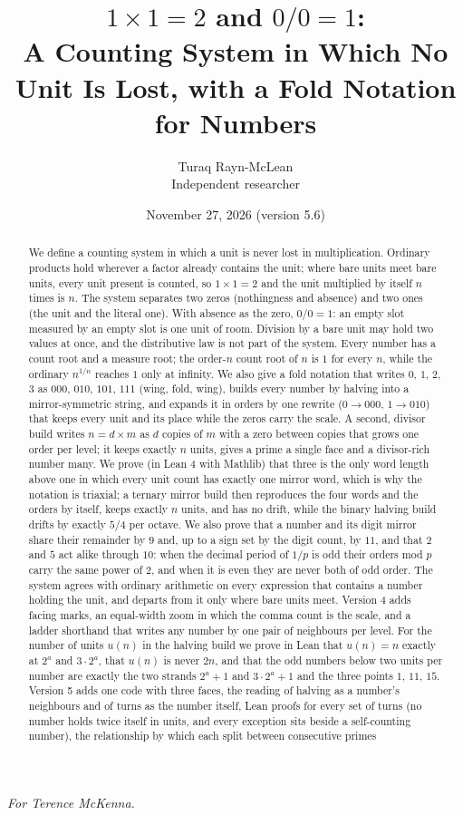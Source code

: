 \documentclass[11pt]{article}
\title{$1\times1 = 2$ and $0/0 = 1$:\\[4pt]\large A Counting System in Which No Unit Is Lost, with a Fold Notation for Numbers}
\author{Turaq Rayn-McLean\\Independent researcher}
\date{November 27, 2026 (version 5.6)}
\begin{document}
\maketitle
\begin{center}\emph{For Terence McKenna.}\end{center}

\begin{abstract}
We define a counting system in which a unit is never lost in multiplication. Ordinary products hold wherever a factor already contains the unit; where bare units meet bare units, every unit present is counted, so $1\times1 = 2$ and the unit multiplied by itself $n$ times is $n$. The system separates two zeros (nothingness and absence) and two ones (the unit and the literal one). With absence as the zero, $0/0 = 1$: an empty slot measured by an empty slot is one unit of room. Division by a bare unit may hold two values at once, and the distributive law is not part of the system. Every number has a count root and a measure root; the order-$n$ count root of $n$ is $1$ for every $n$, while the ordinary $n^{1/n}$ reaches $1$ only at infinity. We also give a fold notation that writes $0$, $1$, $2$, $3$ as $000$, $010$, $101$, $111$ (wing, fold, wing), builds every number by halving into a mirror-symmetric string, and expands it in orders by one rewrite ($0\to000$, $1\to010$) that keeps every unit and its place while the zeros carry the scale. A second, divisor build writes $n = d\times m$ as $d$ copies of $m$ with a zero between copies that grows one order per level; it keeps exactly $n$ units, gives a prime a single face and a divisor-rich number many. We prove (in Lean 4 with Mathlib) that three is the only word length above one in which every unit count has exactly one mirror word, which is why the notation is triaxial; a ternary mirror build then reproduces the four words and the orders by itself, keeps exactly $n$ units, and has no drift, while the binary halving build drifts by exactly $5/4$ per octave. We also prove that a number and its digit mirror share their remainder by $9$ and, up to a sign set by the digit count, by $11$, and that $2$ and $5$ act alike through $10$: when the decimal period of $1/p$ is odd their orders mod $p$ carry the same power of $2$, and when it is even they are never both of odd order. The system agrees with ordinary arithmetic on every expression that contains a number holding the unit, and departs from it only where bare units meet. Version 4 adds facing marks, an equal-width zoom in which the comma count is the scale, and a ladder shorthand that writes any number by one pair of neighbours per level. For the number of units $u(n)$ in the halving build we prove in Lean that $u(n) = n$ exactly at $2^a$ and $3\cdot2^a$, that $u(n)$ is never $2n$, and that the odd numbers below two units per number are exactly the two strands $2^a+1$ and $3\cdot2^a+1$ and the three points $1$, $11$, $15$. Version 5 adds one code with three faces, the reading of halving as a number's neighbours and of turns as the number itself, Lean proofs for every set of turns (no number holds twice itself in units, and every exception sits beside a self-counting number), the relationship by which each split between consecutive primes 
\end{abstract}
\end{document}
